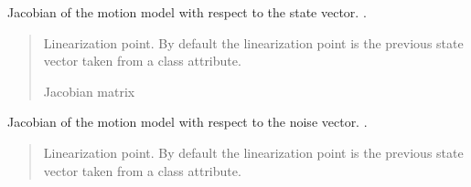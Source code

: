\documentclass[letterpaper,10pt,english]{sphinxmanual}
\begin{document}
\begin{fulllineitems}
\begin{fulllineitems}
\end{fulllineitems}


\begin{fulllineitems}
\label{\detokenize{GFLocalization:EKF_4DOFAUV_CtVelocityMM_DVLDepthYawOM.EKF_4DOFAUV_CtVelocityMM_DVLDepthYawOM.Jfx}}
\pysigstartsignatures
{}
\pysigstopsignatures
\sphinxAtStartPar
Jacobian of the motion model with respect to the state vector. .
\begin{quote}\begin{description}
\sphinxAtStartPar
{} \textendash{} Linearization point. By default the linearization point is the previous state vector taken from a class attribute.

\sphinxAtStartPar
Jacobian matrix

\end{description}\end{quote}

\end{fulllineitems}


\begin{fulllineitems}
\label{\detokenize{GFLocalization:EKF_4DOFAUV_CtVelocityMM_DVLDepthYawOM.EKF_4DOFAUV_CtVelocityMM_DVLDepthYawOM.Jfw}}
\pysigstartsignatures
{}
\pysigstopsignatures
\sphinxAtStartPar
Jacobian of the motion model with respect to the noise vector. .
\begin{quote}\begin{description}
\sphinxAtStartPar
{} \textendash{} Linearization point. By default the linearization point is the previous state vector taken from a class attribute.


\end{description}
\end{quote}
\end{fulllineitems}
\end{fulllineitems}
\end{document}
